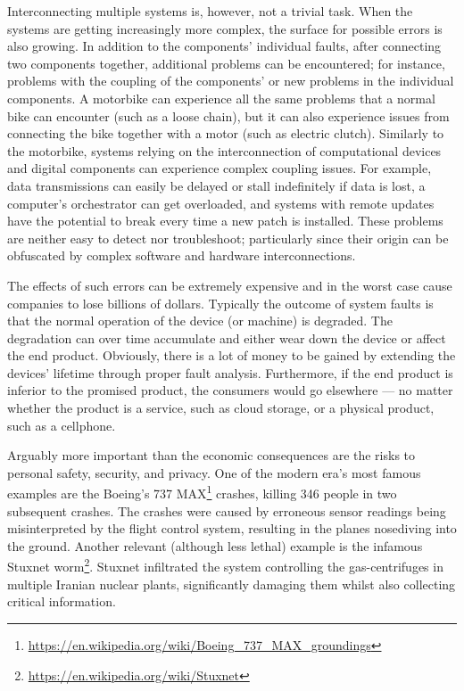 Interconnecting multiple systems is, however, not a trivial task.
When the systems are getting increasingly more complex, the surface for possible errors is also growing.
In addition to the components' individual faults, after connecting two components together, additional problems can be encountered; for instance, problems with the coupling of the components' or new problems in the individual components.
A motorbike can experience all the same problems that a normal bike can encounter (such as a loose chain), but it can also experience issues from connecting the bike together with a motor (such as electric clutch).
Similarly to the motorbike, systems relying on the interconnection of computational devices and digital components can experience complex coupling issues.
For example, data transmissions can easily be delayed or stall indefinitely if data is lost, a computer's orchestrator can get overloaded, and systems with remote updates have the potential to break every time a new patch is installed.
These problems are neither easy to detect nor troubleshoot; particularly since their origin can be obfuscated by complex software and hardware interconnections.

The effects of such errors can be extremely expensive and in the worst case cause companies to lose billions of dollars.
Typically the outcome of system faults is that the normal operation of the device (or machine) is degraded.
The degradation can over time accumulate and either wear down the device or affect the end product.
Obviously, there is a lot of money to be gained by extending the devices' lifetime through proper fault analysis.
Furthermore, if the end product is inferior to the promised product, the consumers would go elsewhere --- no matter whether the product is a service, such as cloud storage, or a physical product, such as a cellphone.

Arguably more important than the economic consequences are the risks to personal safety, security, and privacy.
One of the modern era's most famous examples are the Boeing's 737 MAX\footnote{\url{https://en.wikipedia.org/wiki/Boeing_737_MAX_groundings}} crashes, killing 346 people in two subsequent crashes.
The crashes were caused by erroneous sensor readings being misinterpreted by the flight control system, resulting in the planes nosediving into the ground.
Another relevant (although less lethal) example is the infamous Stuxnet worm\footnote{\url{https://en.wikipedia.org/wiki/Stuxnet}}.
Stuxnet infiltrated the system controlling the gas-centrifuges in multiple Iranian nuclear plants, significantly damaging them whilst also collecting critical information. 

